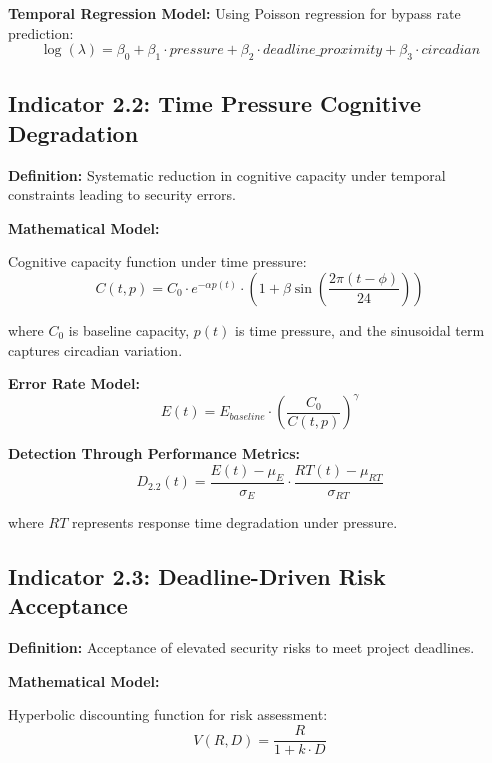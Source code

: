 \documentclass[11pt,a4paper]{article}
\begin{document}
\textbf{Temporal Regression Model:}
Using Poisson regression for bypass rate prediction:
\begin{equation}
\log(\lambda) = \beta_0 + \beta_1 \cdot pressure + \beta_2 \cdot deadline\_proximity + \beta_3 \cdot circadian
\end{equation}

\subsection{Indicator 2.2: Time Pressure Cognitive Degradation}

\textbf{Definition:} Systematic reduction in cognitive capacity under temporal constraints leading to security errors.

\textbf{Mathematical Model:}

Cognitive capacity function under time pressure:
\begin{equation}
C(t,p) = C_0 \cdot e^{-\alpha p(t)} \cdot (1 + \beta \sin(\frac{2\pi(t - \phi)}{24}))
\end{equation}

where $C_0$ is baseline capacity, $p(t)$ is time pressure, and the sinusoidal term captures circadian variation.

\textbf{Error Rate Model:}
\begin{equation}
E(t) = E_{baseline} \cdot \left(\frac{C_0}{C(t,p)}\right)^{\gamma}
\end{equation}

\textbf{Detection Through Performance Metrics:}
\begin{equation}
D_{2.2}(t) = \frac{E(t) - \mu_E}{\sigma_E} \cdot \frac{RT(t) - \mu_{RT}}{\sigma_{RT}}
\end{equation}

where $RT$ represents response time degradation under pressure.

\subsection{Indicator 2.3: Deadline-Driven Risk Acceptance}

\textbf{Definition:} Acceptance of elevated security risks to meet project deadlines.

\textbf{Mathematical Model:}

Hyperbolic discounting function for risk assessment:
\begin{equation}
V(R,D) = \frac{R}{1 + k \cdot D}
\end{equation}
\end{document}
